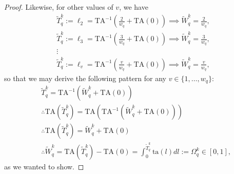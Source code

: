 \documentclass[hidelinks, nonatbib]{elsarticle}
\begin{document}
\begin{corollary}
\begin{proof}
        Likewise, for other values of $v$, we have
        \begin{gather}
            \tilde{T}_{q}^{k}
            :=
            \ell_2
            =
            \text{TA}^{-1}
            \left(
                \frac{2}{w_q}
                +
                \text{TA}(0)
            \right)
            \implies
            \tilde{W}_{q}^{k}
            =
            \frac{2}{w_q}
            ,
            \\
            \tilde{T}_{q}^{k}
            :=
            \ell_3
            =
            \text{TA}^{-1}
            \left(
                \frac{3}{w_q}
                +
                \text{TA}(0)
            \right)
            \implies
            \tilde{W}_{q}^{k}
            =
            \frac{3}{w_q}
            ,
            \\
            \vdots
            \\
            \tilde{T}_{q}^{k}
            :=
            \ell_{v}
            =
            \text{TA}^{-1}
            \left(
                \frac{v}{w_q}
                +
                \text{TA}(0)
            \right)
            \implies
            \tilde{W}_{q}^{k}
            =
            \frac{v}{w_q}
            ,
        \end{gather}
        so that we may derive the following pattern for any $v \in \{1, \dots, w_q\}$:
        \begin{align}
            &\tilde{T}_{q}^{k}
            =
            \text{TA}^{-1}
            \left(
                \tilde{W}_{q}^{k}
                +
                \text{TA}(0)
            \right)
            \\
            &
            \therefore
            \text{TA}
            (
                \tilde{T}_{q}^{k}
            )
            =
            \text{TA}
            \left(
                \text{TA}^{-1}
                \left(
                    \tilde{W}_{q}^{k}
                    +
                    \text{TA}(0)
                \right)
            \right)
            \\
            &
            \therefore
            \text{TA}
            (
                \tilde{T}_{q}^{k}
            )
            =
            \tilde{W}_{q}^{k}
            +
            \text{TA}(0)
            \\
            &
            \therefore
            \tilde{W}_{q}^{k}
            =
            \text{TA}
            (
                \tilde{T}_{q}^{k}
            )
            -
            \text{TA}(0)
            =
            \int_{0}^{\tilde{T}_{q}^{k}}
            \text{ta}(l)
            dl
            :=
            \Omega_{q}^{k}
            \in 
            [0,1]
            ,
        \end{align}
        as we wanted to show.
        

\end{proof}
\end{corollary}
\end{document}
